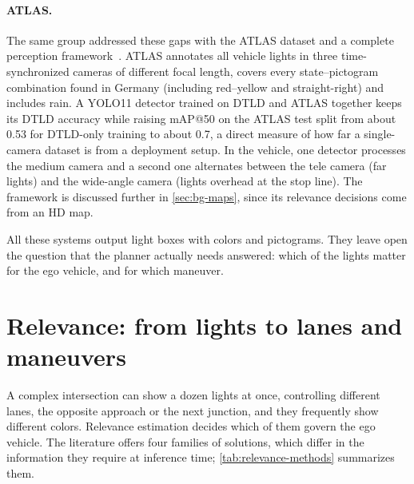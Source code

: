 \paragraph{ATLAS.} The same group addressed these gaps with the ATLAS dataset and a complete
perception framework~\cite{polley2025atlas}. ATLAS annotates all vehicle lights in three time-synchronized
cameras of different focal length, covers every state--pictogram combination found in Germany
(including red--yellow and straight-right) and includes rain. A YOLO11 detector trained on DTLD and
ATLAS together keeps its DTLD accuracy while raising mAP@50 on the ATLAS test split from about 0.53 for
DTLD-only training to about 0.7, a direct measure of how far a single-camera dataset is from a
deployment setup. In the vehicle, one detector processes the medium camera and a second one alternates
between the tele camera (far lights) and the wide-angle camera (lights overhead at the stop line). The
framework is discussed further in \cref{sec:bg-maps}, since its relevance decisions come from an HD
map.

All these systems output light boxes with colors and pictograms. They leave open the question that the
planner actually needs answered: which of the lights matter for the ego vehicle, and for which
maneuver.

\section{Relevance: from lights to lanes and maneuvers}
\label{sec:bg-relevance}

A complex intersection can show a dozen lights at once, controlling different lanes, the opposite
approach or the next junction, and they frequently show different colors. Relevance estimation
decides which of them govern the ego vehicle. The literature offers four families of solutions, which
differ in the information they require at inference time; \cref{tab:relevance-methods} summarizes them.

